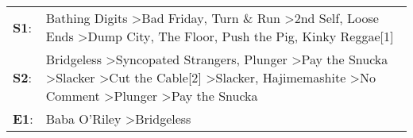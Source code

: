 \begin{supertabular}{p{0.03\textwidth}p{0.92\textwidth}}
 \textbf{S1}:  &                                                                                                                                                   Bathing Digits\textsuperscript{} \textgreater \enspace Bad Friday\textsuperscript{}, \enspace Turn \& Run\textsuperscript{} \textgreater \enspace 2nd Self\textsuperscript{}, \enspace Loose Ends\textsuperscript{} \textgreater \enspace Dump City\textsuperscript{}, \enspace The Floor\textsuperscript{}, \enspace Push the Pig\textsuperscript{}, \enspace Kinky Reggae[1]\textsuperscript{}  \enspace  \\
 \textbf{S2}:  &  Bridgeless\textsuperscript{} \textgreater \enspace Syncopated Strangers\textsuperscript{}, \enspace Plunger\textsuperscript{} \textgreater \enspace Pay the Snucka\textsuperscript{} \textgreater \enspace Slacker\textsuperscript{} \textgreater \enspace Cut the Cable[2]\textsuperscript{} \textgreater \enspace Slacker\textsuperscript{}, \enspace Hajimemashite\textsuperscript{} \textgreater \enspace No Comment\textsuperscript{} \textgreater \enspace Plunger\textsuperscript{} \textgreater \enspace Pay the Snucka\textsuperscript{}  \enspace  \\
 \textbf{E1}:  &                                                                                                                                                                                                                                                                                                                                                                                                                                                                  Baba O'Riley\textsuperscript{} \textgreater \enspace Bridgeless\textsuperscript{}  \enspace  \\
\end{supertabular}
